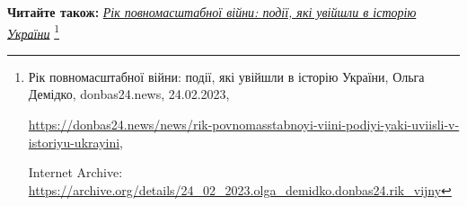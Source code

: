  
 
 
 
 


\textbf{Читайте також:} \href{https://archive.org/details/24_02_2023.olga_demidko.donbas24.rik_vijny}{\emph{Рік повномасштабної війни: події, які увійшли в історію України}}%
\footnote{Рік повномасштабної війни: події, які увійшли в історію України, Ольга Демідко, donbas24.news, 24.02.2023, \par%
\url{https://donbas24.news/news/rik-povnomasstabnoyi-viini-podiyi-yaki-uviisli-v-istoriyu-ukrayini}, \par%
Internet Archive: \url{https://archive.org/details/24_02_2023.olga_demidko.donbas24.rik_vijny}%
}
